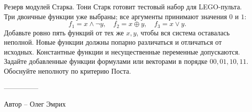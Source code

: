 \question
Резерв модулей Старка. Тони Старк готовит тестовый набор для LEGO-пульта. Три двоичные функции уже выбраны; все аргументы принимают значения $0$ и $1$:
\[
f_1=x\land\neg y,\quad f_2=x\oplus y,\quad f_3=x\lor y.
\]
Добавьте ровно пять функций от тех же $x,y$, чтобы вся система оставалась неполной. Новые функции должны попарно различаться и отличаться от исходных. Константные функции и несущественные переменные допускаются. Задайте добавленные функции формулами или векторами в порядке $00,01,10,11$. Обоснуйте неполноту по критерию Поста.

---------------

Автор -- Олег Эмрих
